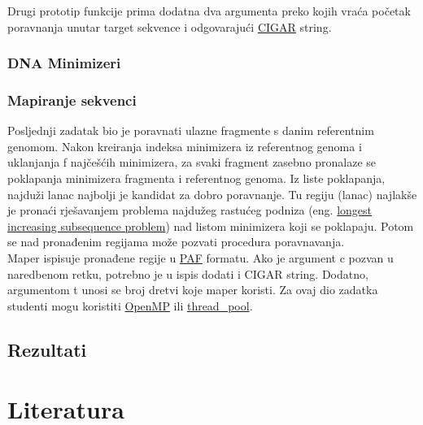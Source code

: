 \documentclass[times, 12pt, utf8]{article}
\begin{document}
	Drugi prototip funkcije prima dodatna dva argumenta preko kojih
	vraća početak poravnanja unutar \colorbox{gray!30}{target}
	sekvence i odgovarajući \href {https://samtools.github.io/hts-specs/SAMv1.pdf}{CIGAR} string.
	
	\subsubsection{DNA Minimizeri}
	\subsubsection{Mapiranje sekvenci}
	Posljednji zadatak bio je poravnati ulazne fragmente s danim referentnim genomom.
	Nakon kreiranja indeksa minimizera iz referentnog genoma i uklanjanja f najčešćih minimizera, za svaki fragment zasebno pronalaze se poklapanja minimizera fragmenta i referentnog genoma. Iz liste poklapanja, najduži lanac najbolji je kandidat za dobro poravnanje. Tu regiju (lanac) najlakše je pronaći rješavanjem problema najdužeg rastućeg podniza (eng. \href{https://en.wikipedia.org/wiki/Longest_increasing_subsequence}{longest increasing subsequence problem}) nad listom minimizera koji se poklapaju. 
	Potom se nad pronađenim regijama može pozvati procedura poravnavanja. \\
	Maper ispisuje pronađene regije u \href{https://github.com/lh3/miniasm/blob/master/PAF.md}{PAF} formatu. Ako je argument \colorbox{gray!30}{c} pozvan u naredbenom retku, potrebno je u ispis dodati i CIGAR string.
	Dodatno, argumentom \colorbox{gray!30}{t} unosi se broj dretvi koje maper koristi. Za ovaj dio zadatka studenti mogu koristiti \href{https://www.openmp.org/}{OpenMP} ili \href{https://github.com/rvaser/thread_pool}{thread\_pool}.
	
	\subsection{Rezultati}
	
	\section{Literatura}
	
	
\end{document}
